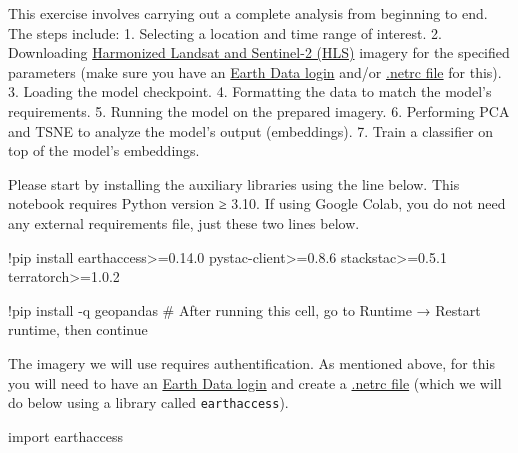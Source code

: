 \documentclass[
  letterpaper,
  DIV=11,
  numbers=noendperiod]{scrreprt}
\newenvironment{Shaded}{\begin{snugshade}}{\end{snugshade}}
\newcommand{\CommentTok}[1]{\textcolor[rgb]{0.37,0.37,0.37}{#1}}
\newcommand{\FloatTok}[1]{\textcolor[rgb]{0.68,0.00,0.00}{#1}}
\newcommand{\ImportTok}[1]{\textcolor[rgb]{0.00,0.46,0.62}{#1}}
\newcommand{\NormalTok}[1]{\textcolor[rgb]{0.00,0.23,0.31}{#1}}
\newcommand{\OperatorTok}[1]{\textcolor[rgb]{0.37,0.37,0.37}{#1}}
\begin{document}
This exercise involves carrying out a complete analysis from beginning
to end. The steps include: 1. Selecting a location and time range of
interest. 2. Downloading \href{https://hls.gsfc.nasa.gov/}{Harmonized
Landsat and Sentinel-2 (HLS)} imagery for the specified parameters (make
sure you have an \href{https://urs.earthdata.nasa.gov/}{Earth Data
login} and/or
\href{https://urs.earthdata.nasa.gov/documentation/for_users/data_access/create_net_rc_file}{.netrc
file} for this). 3. Loading the model checkpoint. 4. Formatting the data
to match the model's requirements. 5. Running the model on the prepared
imagery. 6. Performing PCA and TSNE to analyze the model's output
(embeddings). 7. Train a classifier on top of the model's embeddings.

Please start by installing the auxiliary libraries using the line below.
This notebook requires Python version ≥ 3.10. If using Google Colab, you
do not need any external requirements file, just these two lines below.

\begin{Shaded}
\begin{Highlighting}[]
\OperatorTok{!}\NormalTok{pip install earthaccess}\OperatorTok{\textgreater{}=}\FloatTok{0.14.0}\NormalTok{ pystac}\OperatorTok{{-}}\NormalTok{client}\OperatorTok{\textgreater{}=}\FloatTok{0.8.6}\NormalTok{ stackstac}\OperatorTok{\textgreater{}=}\FloatTok{0.5.1}\NormalTok{ terratorch}\OperatorTok{\textgreater{}=}\FloatTok{1.0.2}
\end{Highlighting}
\end{Shaded}

\begin{Shaded}
\begin{Highlighting}[]
\OperatorTok{!}\NormalTok{pip install }\OperatorTok{{-}}\NormalTok{q geopandas}
\CommentTok{\# After running this cell, go to Runtime → Restart runtime, then continue}
\end{Highlighting}
\end{Shaded}

The imagery we will use requires authentification. As mentioned above,
for this you will need to have an
\href{https://urs.earthdata.nasa.gov/}{Earth Data login} and create a
\href{https://urs.earthdata.nasa.gov/documentation/for_users/data_access/create_net_rc_file}{.netrc
file} (which we will do below using a library called
\texttt{earthaccess}).

\begin{Shaded}
\begin{Highlighting}[]
\ImportTok{import}\NormalTok{ earthaccess}
\end{Highlighting}
\end{Shaded}
\end{document}
